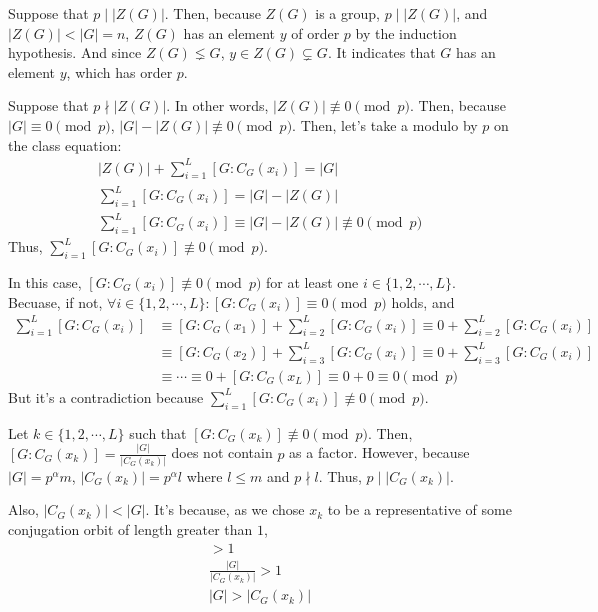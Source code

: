 \documentclass{article}
\begin{document}
Suppose that \(p \mid |Z(G)|\).
Then, because \(Z(G)\) is a group, \(p \mid |Z(G)|\), and \(|Z(G)| < |G| = n\), \(Z(G)\) has an element \(y\) of order \(p\) by the induction hypothesis.
And since \(Z(G) \lneq G\), \(y \in Z(G) \subsetneq G\).
It indicates that \(G\) has an element \(y\), which has order \(p\).
\newline

Suppose that \(p \nmid |Z(G)|\).
In other words, \(|Z(G)| \not\equiv 0 \pmod{p}\).
Then, because \(|G| \equiv 0 \pmod{p}\), \(|G| - |Z(G)| \not\equiv 0 \pmod{p}\).
Then, let's take a modulo by \(p\) on the class equation:
\begin{gather*}
  |Z(G)| + \sum_{i=1}^{L} [G : C_G(x_i)] = |G|
  \\\sum_{i=1}^{L} [G : C_G(x_i)] = |G| - |Z(G)|
  \\\sum_{i=1}^{L} [G : C_G(x_i)] \equiv |G| - |Z(G)| \not\equiv 0 \pmod{p}
\end{gather*}
Thus, \(\sum_{i=1}^{L} [G : C_G(x_i)] \not\equiv 0 \pmod{p}\).

In this case, \([G : C_G(x_i)] \not\equiv 0 \pmod{p}\) for at least one \(i \in \{1, 2, \cdots, L\}\). Becuase, if not, \(\forall i \in \{1, 2, \cdots, L\}: [G : C_G(x_i)] \equiv 0 \pmod{p}\) holds, and
\begin{align*}
  \sum_{i=1}^{L} [G : C_G(x_i)]
  &\equiv [G : C_G(x_1)] + \sum_{i=2}^{L} [G : C_G(x_i)]
  \equiv 0 + \sum_{i=2}^{L} [G : C_G(x_i)]
  \\&\equiv [G : C_G(x_2)] + \sum_{i=3}^{L} [G : C_G(x_i)]
  \equiv 0 + \sum_{i=3}^{L} [G : C_G(x_i)]
  \\&\equiv \cdots
  \equiv 0 + [G : C_G(x_L)]
  \equiv 0 + 0
  \equiv 0 \pmod{p}
\end{align*}
But it's a contradiction because \(\sum_{i=1}^{L} [G : C_G(x_i)] \not\equiv 0 \pmod{p}\).

Let \(k \in \{1, 2, \cdots, L\}\) such that \([G : C_G(x_k)] \not\equiv 0 \pmod{p}\).
Then, \([G : C_G(x_k)] = \frac{|G|}{|C_G(x_k)|}\) does not contain \(p\) as a factor.
However, because \(|G| = p^{\alpha}m\), \(|C_G(x_k)| = p^{\alpha}l\)
where \(l \le m\) and \(p \nmid l\).
Thus, \(p \mid |C_G(x_k)|\).

Also, \(|C_G(x_k)| < |G|\).
It's because, as we chose \(x_k\) to be a representative of some conjugation orbit of length greater than \(1\),
\begin{gather*}
  [G : C_G(x_k)] > 1
  \\ \frac{|G|}{|C_G(x_k)|} > 1
  \\ |G| > |C_G(x_k)|
\end{gather*}
\end{document}
